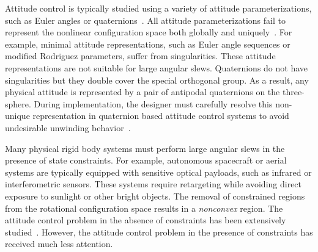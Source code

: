 \documentclass[letterpaper, 10 pt, conference]{ieeeconf}  %
\begin{document}
Attitude control is typically studied using a variety of attitude parameterizations, such as Euler angles or quaternions~\cite{shuster1993}.
All attitude parameterizations fail to represent the nonlinear configuration space both globally and uniquely~\cite{chaturvedi2011a}.
For example, minimal attitude representations, such as Euler angle sequences or modified Rodriguez parameters, suffer from singularities.
These attitude representations are not suitable for large angular slews.
Quaternions do not have singularities but they double cover the special orthogonal group.
As a result, any physical attitude is represented by a pair of antipodal quaternions on the three-sphere.
During implementation, the designer must carefully resolve this non-unique representation in quaternion based attitude control systems to avoid undesirable unwinding behavior~\cite{bhat2000}.

Many physical rigid body systems must perform large angular slews in the presence of state constraints.
For example, autonomous spacecraft or aerial systems are typically equipped with sensitive optical payloads, such as infrared or interferometric sensors.
These systems require retargeting while avoiding direct exposure to sunlight or other bright objects.
The removal of constrained regions from the rotational configuration space results in a \textit{nonconvex} region.
The attitude control problem in the absence of constraints has been extensively studied~\cite{bullo2004,MayTeePaCC11,LEEITAC15}.
However, the attitude control problem in the presence of constraints has received much less attention.
\end{document}
